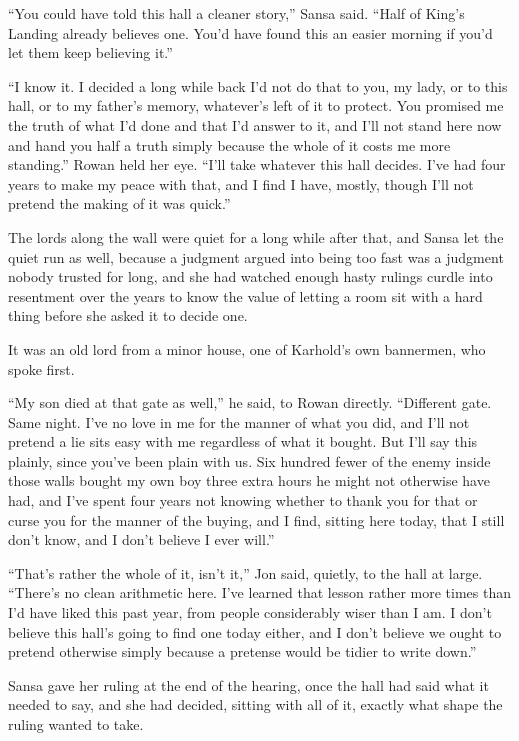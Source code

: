 \sceneBreak

“You could have told this hall a cleaner story,” Sansa said. “Half of King’s Landing already believes one. You’d have found this an easier morning if you’d let them keep believing it.”

“I know it. I decided a long while back I’d not do that to you, my lady, or to this hall, or to my father’s memory, whatever’s left of it to protect. You promised me the truth of what I’d done and that I’d answer to it, and I’ll not stand here now and hand you half a truth simply because the whole of it costs me more standing.” Rowan held her eye. “I’ll take whatever this hall decides. I’ve had four years to make my peace with that, and I find I have, mostly, though I’ll not pretend the making of it was quick.”

\sceneBreak

The lords along the wall were quiet for a long while after that, and Sansa let the quiet run as well, because a judgment argued into being too fast was a judgment nobody trusted for long, and she had watched enough hasty rulings curdle into resentment over the years to know the value of letting a room sit with a hard thing before she asked it to decide one.

It was an old lord from a minor house, one of Karhold’s own bannermen, who spoke first.

“My son died at that gate as well,” he said, to Rowan directly. “Different gate. Same night. I’ve no love in me for the manner of what you did, and I’ll not pretend a lie sits easy with me regardless of what it bought. But I’ll say this plainly, since you’ve been plain with us. Six hundred fewer of the enemy inside those walls bought my own boy three extra hours he might not otherwise have had, and I’ve spent four years not knowing whether to thank you for that or curse you for the manner of the buying, and I find, sitting here today, that I still don’t know, and I don’t believe I ever will.”

“That’s rather the whole of it, isn’t it,” Jon said, quietly, to the hall at large. “There’s no clean arithmetic here. I’ve learned that lesson rather more times than I’d have liked this past year, from people considerably wiser than I am. I don’t believe this hall’s going to find one today either, and I don’t believe we ought to pretend otherwise simply because a pretense would be tidier to write down.”

\sceneBreak

Sansa gave her ruling at the end of the hearing, once the hall had said what it needed to say, and she had decided, sitting with all of it, exactly what shape the ruling wanted to take.

